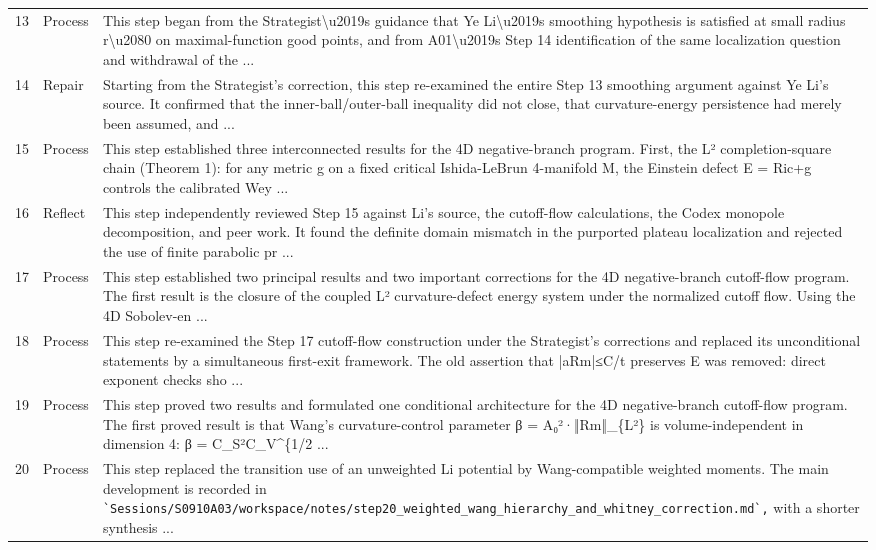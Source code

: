 \documentclass[UTF8,fontset=fandol,zihao=-4]{ctexart}
\begin{document}
\begin{longtable}{r p{} >{\raggedright\arraybackslash}p{}}
13 & Process & This step began from the Strategist\textbackslash{}u2019s guidance that Ye Li\textbackslash{}u2019s smoothing hypothesis is satisfied at small radius r\textbackslash{}u2080 on maximal-function good points, and from A01\textbackslash{}u2019s Step 14 identification of the same localization question and withdrawal of the  ...\\
14 & Repair & Starting from the Strategist's correction, this step re-examined the entire Step 13 smoothing argument against Ye Li's source. It confirmed that the inner-ball/outer-ball inequality did not close, that curvature-energy persistence had merely been assumed, and  ...\\
15 & Process & This step established three interconnected results for the 4D negative-branch program. First, the L² completion-square chain (Theorem 1): for any metric g on a fixed critical Ishida-LeBrun 4-manifold M, the Einstein defect E = Ric+g controls the calibrated Wey ...\\
16 & Reflect & This step independently reviewed Step 15 against Li’s source, the cutoff-flow calculations, the Codex monopole decomposition, and peer work. It found the definite domain mismatch in the purported plateau localization and rejected the use of finite parabolic pr ...\\
17 & Process & This step established two principal results and two important corrections for the 4D negative-branch cutoff-flow program. The first result is the closure of the coupled L² curvature-defect energy system under the normalized cutoff flow. Using the 4D Sobolev-en ...\\
18 & Process & This step re-examined the Step 17 cutoff-flow construction under the Strategist’s corrections and replaced its unconditional statements by a simultaneous first-exit framework. The old assertion that |aRm|≤C/t preserves E was removed: direct exponent checks sho ...\\
19 & Process & This step proved two results and formulated one conditional architecture for the 4D negative-branch cutoff-flow program. The first proved result is that Wang's curvature-control parameter β = A₀²·‖Rm‖\_\{L²\} is volume-independent in dimension 4: β = C\_S²C\_V\textasciicircum{}\{1/2 ...\\
20 & Process & This step replaced the transition use of an unweighted Li potential by Wang-compatible weighted moments. The main development is recorded in \nolinkurl{`Sessions/S0910A03/workspace/notes/step20_weighted_wang_hierarchy_and_whitney_correction.md`,} with a shorter synthesis  ...\\

\end{longtable}
\end{document}

